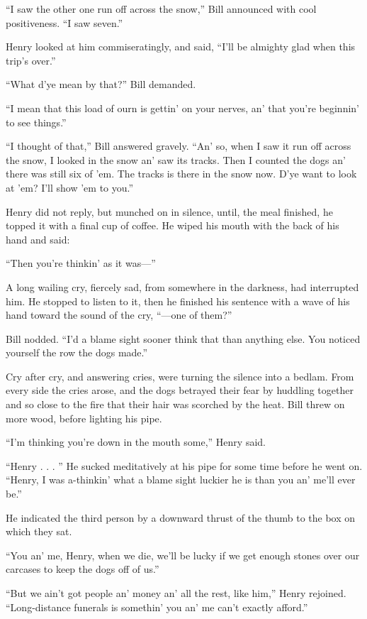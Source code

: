 \documentclass[10pt]{book}
\begin{document}
“I saw the other one run off across the snow,” Bill announced with cool
positiveness. “I saw seven.”

Henry looked at him commiseratingly, and said, “I’ll be almighty glad
when this trip’s over.”

“What d’ye mean by that?” Bill demanded.

“I mean that this load of ourn is gettin’ on your nerves, an’ that
you’re beginnin’ to see things.”

“I thought of that,” Bill answered gravely. “An’ so, when I saw it run
off across the snow, I looked in the snow an’ saw its tracks. Then I
counted the dogs an’ there was still six of ’em. The tracks is there in
the snow now. D’ye want to look at ’em? I’ll show ’em to you.”

Henry did not reply, but munched on in silence, until, the meal
finished, he topped it with a final cup of coffee. He wiped his mouth
with the back of his hand and said:

“Then you’re thinkin’ as it was—”

A long wailing cry, fiercely sad, from somewhere in the darkness, had
interrupted him. He stopped to listen to it, then he finished his
sentence with a wave of his hand toward the sound of the cry, “—one of
them?”

Bill nodded. “I’d a blame sight sooner think that than anything else.
You noticed yourself the row the dogs made.”

Cry after cry, and answering cries, were turning the silence into a
bedlam. From every side the cries arose, and the dogs betrayed their
fear by huddling together and so close to the fire that their hair was
scorched by the heat. Bill threw on more wood, before lighting his
pipe.

“I’m thinking you’re down in the mouth some,” Henry said.

“Henry . . . ” He sucked meditatively at his pipe for some time before
he went on. “Henry, I was a-thinkin’ what a blame sight luckier he is
than you an’ me’ll ever be.”

He indicated the third person by a downward thrust of the thumb to the
box on which they sat.

“You an’ me, Henry, when we die, we’ll be lucky if we get enough stones
over our carcases to keep the dogs off of us.”

“But we ain’t got people an’ money an’ all the rest, like him,” Henry
rejoined. “Long-distance funerals is somethin’ you an’ me can’t exactly
afford.”
\end{document}
